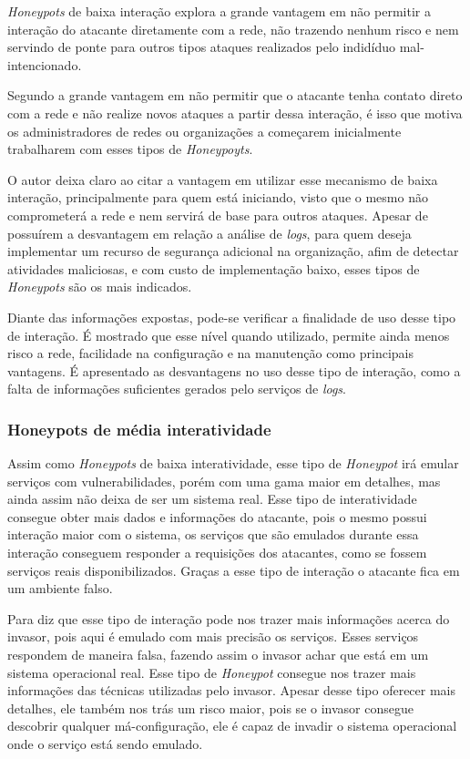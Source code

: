 \textit{Honeypots} de baixa interação explora a grande vantagem em não permitir a interação do atacante diretamente com a rede, não trazendo nenhum risco e nem servindo de ponte para outros tipos ataques realizados pelo indidíduo mal-intencionado.

Segundo  a grande vantagem em não permitir que o atacante tenha contato direto com a rede e não realize novos ataques a partir dessa interação, é isso que motiva os administradores de redes ou organizações a começarem inicialmente trabalharem com esses tipos de \textit{Honeypoyts}.

O autor deixa claro ao citar a vantagem em utilizar esse mecanismo de baixa interação, principalmente para quem está iniciando, visto que o mesmo não comprometerá a rede e nem servirá de base para outros ataques. Apesar de possuírem a desvantagem em relação a análise de \textit{logs}, para quem deseja implementar um recurso de segurança adicional na organização, afim de detectar atividades maliciosas, e com custo de implementação baixo, esses tipos de \textit{Honeypots} são os mais indicados.

Diante das informações expostas, pode-se verificar a finalidade de uso desse tipo de interação. É mostrado que esse nível quando utilizado, permite ainda menos risco a rede, facilidade na configuração e na manutenção como principais vantagens. É apresentado as desvantagens no uso desse tipo de interação, como a falta de informações suficientes gerados pelo serviços de \textit{logs}.

\subsubsection{Honeypots de média interatividade}
Assim como \textit{Honeypots} de baixa interatividade, esse tipo de \textit{Honeypot} irá emular serviços com vulnerabilidades, porém com uma gama maior em detalhes, mas ainda assim não deixa de ser um sistema real. Esse tipo de interatividade consegue obter mais dados e informações do atacante, pois o mesmo possui interação maior com o sistema, os serviços que são emulados durante essa interação conseguem responder a requisições dos atacantes, como se fossem serviços reais disponibilizados. Graças a esse tipo de interação o atacante fica em um ambiente falso.

Para  diz que esse tipo de interação pode nos trazer mais informações acerca do invasor, pois aqui é emulado com mais precisão os serviços. Esses serviços respondem de maneira falsa, fazendo assim o invasor achar que está em um sistema operacional real. Esse tipo de \textit{Honeypot} consegue nos trazer mais informações das técnicas utilizadas pelo invasor. Apesar desse tipo oferecer mais detalhes, ele também nos trás um risco maior, pois se o invasor consegue descobrir qualquer má-configuração, ele é capaz de invadir o sistema operacional onde o serviço está sendo emulado.

